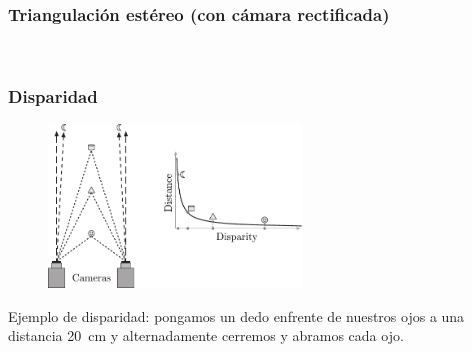 \begin{frame}
    \frametitle{Triangulación estéreo (con cámara rectificada)}
    
    \begin{figure}[!htb]
        \centering
        \hspace{1em}
        \\
    \end{figure}
    
    
\end{frame}

\begin{frame}
    \frametitle{Disparidad}
    \footnotesize
    \begin{figure}[!h]
        \includegraphics[width=0.6\textwidth]{images/disparity.pdf}
    \end{figure}

    Ejemplo de disparidad: pongamos un dedo enfrente de nuestros ojos a una distancia \SI{20}{\centi\meter} y alternadamente cerremos y abramos cada ojo.
\end{frame}


